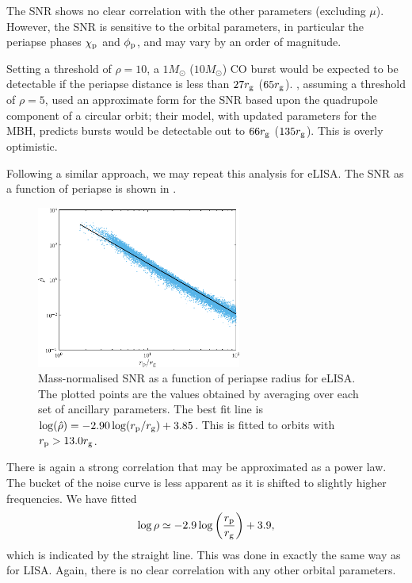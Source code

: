 The SNR shows no clear correlation with the other parameters (excluding $\mu$). However, the SNR is sensitive to the orbital parameters, in particular the periapse phases $\chi_\mathrm{p}$ and $\phi_\mathrm{p}$, and may vary by an order of magnitude.

Setting a threshold of $\rho = 10$, a $1 M_\odot$ ($10 M_\odot$) CO burst would be expected to be detectable if the periapse distance is less than $27 r_\mathrm{g}$ ($65 r_\mathrm{g}$). \citet{Hopman2007}, assuming a threshold of $\rho = 5$, used an approximate form for the SNR based upon the quadrupole component of a circular orbit; their model, with updated parameters for the MBH, predicts bursts would be detectable out to $66 r_\mathrm{g}$ ($135 r_\mathrm{g}$). This is overly optimistic.

Following a similar approach, we may repeat this analysis for eLISA. The SNR as a function of periapse is shown in .
\begin{figure}
  \centering
  \includegraphics[width=0.6\textwidth]{./images/Fig_SNR_eLISA_NGO}
    \caption{Mass-normalised SNR as a function of periapse radius for eLISA. The plotted points are the values obtained by averaging over each set of ancillary parameters. The best fit line is $\log(\hat{\rho}) = -2.90\log(r_\mathrm{p}/r_\mathrm{g}) + 3.85$. This is fitted to orbits with $r_\mathrm{p} >  13.0 r_\mathrm{g}$.}
    \label{fig:SNR-eLISA}
\end{figure}
There is again a strong correlation that may be approximated as a power law. The bucket of the noise curve is less apparent as it is shifted to slightly higher frequencies. We have fitted
\begin{equation}
\log\rho \simeq -2.9\log\left(\dfrac{r_\mathrm{p}}{r_\mathrm{g}}\right) + 3.9,
\label{eq:SNR-power-law-eLISA}
\end{equation}
which is indicated by the straight line. This was done in exactly the same way as for LISA. Again, there is no clear correlation with any other orbital parameters.

